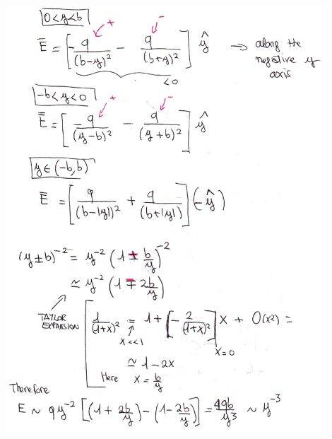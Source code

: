 \documentclass{esg8022pset}
\begin{document}
\begin{solution}
  \begin{center}\includegraphics[width=0.9\textwidth]{ps01_sol_07_2_hand}\end{center}
\end{solution}
\end{document}
